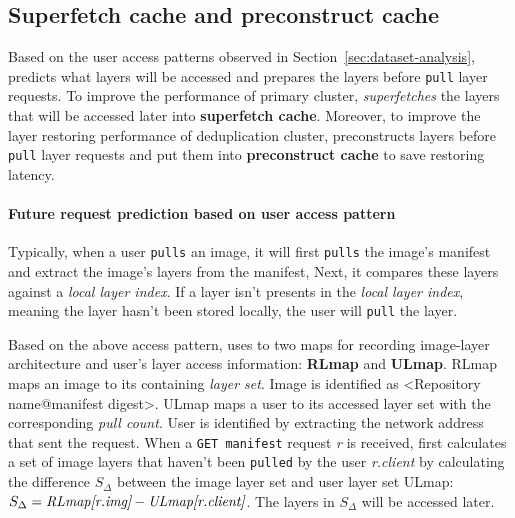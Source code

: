 
\subsection{Superfetch cache and preconstruct cache}
\label{sec:cache-design}


%

Based on the user access patterns observed in Section~\ref{sec:dataset-analysis},
\sysname predicts what layers will be accessed and prepares the layers before \texttt{pull} layer requests.
To improve the performance of primary cluster,
\sysname \emph{superfetches} the layers that will be accessed later into \textbf{superfetch cache}.
Moreover, 
to improve the layer restoring performance of deduplication cluster,
\sysname preconstructs layers before \texttt{pull} layer requests 
and put them into \textbf{preconstruct cache} to save restoring latency.

\paragraph{Future request prediction based on user access pattern}
Typically, when a user 
 \texttt{pulls} an image,
it will first \texttt{pulls} the image's manifest and extract the image's layers from the manifest, 
Next, it compares these layers against a \emph{local layer index}.
If a layer isn't presents in the \emph{local layer index}, meaning the layer hasn't been stored locally,
the user will \texttt{pull} the layer.

Based on the above access pattern, 
\sysname uses to two maps for recording image-layer architecture and user's layer access information:
\textbf{RLmap} and \textbf{ULmap}.
 RLmap maps an image to its containing \emph{layer set}.
 Image is identified as \textless Repository name@manifest digest\textgreater.
ULmap maps a user to its accessed layer set with the corresponding \emph{pull count}.
 User is identified by extracting the network address that sent the request. 
 When a \texttt{GET manifest} request \emph{r} is received,
\sysname first calculates a set of image layers that haven't been \texttt{pulled} by the user \emph{r.client} by 
calculating the difference $S_{\Delta}$ between the image layer set and user layer set ULmap:
$ S_{\Delta} = \emph{RLmap[r.img]} - \emph{ULmap[r.client]}$.
The layers in $S_{\Delta}$ will be accessed later.

